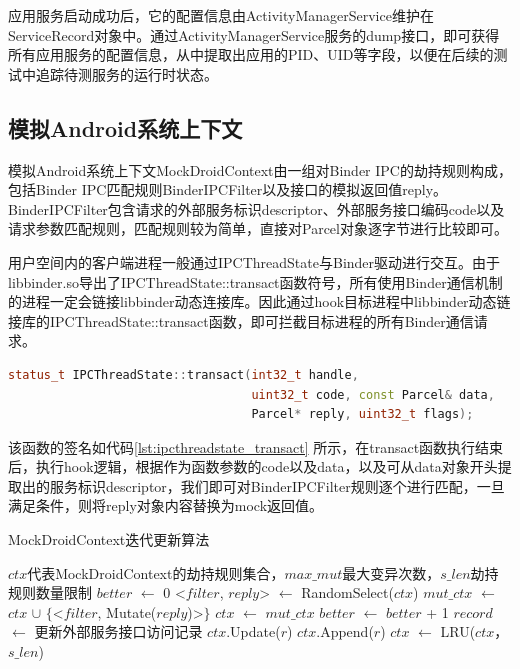 \documentclass[winfonts,master,twoside]{njuthesis}
\begin{document}
应用服务启动成功后，它的配置信息由ActivityManagerService维护在ServiceRecord对象中。通过ActivityManagerService服务的dump接口，即可获得所有应用服务的配置信息，从中提取出应用的PID、UID等字段，以便在后续的测试中追踪待测服务的运行时状态。

\subsection{模拟Android系统上下文}

模拟Android系统上下文MockDroidContext由一组对Binder IPC的劫持规则构成，包括Binder IPC匹配规则BinderIPCFilter以及接口的模拟返回值reply。BinderIPCFilter包含请求的外部服务标识descriptor、外部服务接口编码code以及请求参数匹配规则，匹配规则较为简单，直接对Parcel对象逐字节进行比较即可。

用户空间内的客户端进程一般通过IPCThreadState与Binder驱动进行交互。由于libbinder.so导出了IPCThreadState::transact函数符号，所有使用Binder通信机制的进程一定会链接libbinder动态连接库。因此通过hook目标进程中libbinder动态链接库的IPCThreadState::transact函数，即可拦截目标进程的所有Binder通信请求。

\begin{lstlisting}[caption={hook目标函数签名},label={lst:ipcthreadstate_transact},language=C++,basicstyle=\footnotesize]
status_t IPCThreadState::transact(int32_t handle, 
                                  uint32_t code, const Parcel& data,
                                  Parcel* reply, uint32_t flags);
\end{lstlisting}

该函数的签名如代码\ref{lst:ipcthreadstate_transact} 所示，在transact函数执行结束后，执行hook逻辑，根据作为函数参数的code以及data，以及可从data对象开头提取出的服务标识descriptor，我们即可对BinderIPCFilter规则逐个进行匹配，一旦满足条件，则将reply对象内容替换为mock返回值。

\begin{algorithm}[htbp]
	\caption{MockDroidContext迭代更新算法}
	\label{alg:state_update}
	\begin{algorithmic}[1]
		\REQUIRE $ctx$代表MockDroidContext的劫持规则集合，$max\_mut$最大变异次数，$s\_len$劫持规则数量限制
		\STATE $better$ $\gets$ 0
		\STATE <$filter$, $reply$> $\gets$ RandomSelect($ctx$)
		\STATE $mut\_ctx$ $\gets$ $ctx$ $\cup$ $\{$<$filter$, Mutate($reply$)>$\}$
		\STATE $ctx$ $\gets$ $mut\_ctx$
		\STATE $better$ $\gets$ $better$ + 1
		\ENDIF
		\ENDWHILE
		\STATE $record$ $\gets$ 更新外部服务接口访问记录
		\STATE $ctx$.Update($r$)
		\ELSE
		\STATE $ctx$.Append($r$)
		\ENDIF
		\ENDFOR
		\STATE $ctx$ $\gets$ LRU($ctx$，$s\_len$)
		\ENDIF
	\end{algorithmic}
\end{algorithm}
\end{document}
